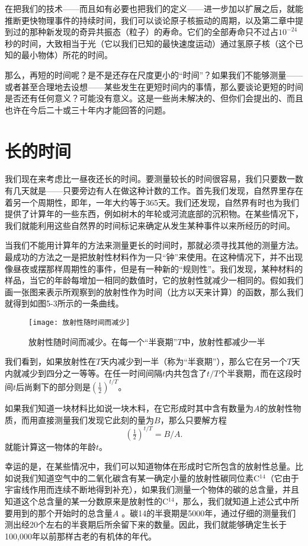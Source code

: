 \documentclass[11pt,oneside]{book}
\begin{document}
\begin{common-format}
在把我们的技术——而且如有必要也把我们的定义——进一步加以扩展之后，就能推断更快物理事件的持续时间，我们可以谈论原子核振动的周期，以及第二章中提到过的那种新发现的奇异共振态（粒子）的寿命。它们的全部寿命只不过占$ 10^{-24} $秒的时间，大致相当于光（它以我们已知的最快速度运动）通过氢原子核（这个已知的最小物体）所花的时间。

那么，再短的时间呢？是不是还存在尺度更小的“时间”？如果我们不能够测量——或者甚至合理地去设想——某些发生在更短时间内的事情，那么要谈论更短的时间是否还有任何意义？可能没有意义。这是一些尚未解决的、但你们会提出的、而且也许在今后二十或三十年内才能回答的问题。


\section{长的时间}
我们现在来考虑比一昼夜还长的时间。要测量较长的时间很容易，我们只要数一数有几天就是——只要旁边有人在做这种计数的工作。首先我们发现，自然界里存在着另一个周期性，即年，一年大约等于365天。我们还发现，自然界有时也为我们提供了计算年的一些东西，例如树木的年轮或河流底部的沉积物。在某些情况下，我们就能利用这些自然界的时间标记来确定从发生某种事件以来所经历的时间。

当我们不能用计算年的方法来测量更长的时间时，那就必须寻找其他的测量方法。最成功的方法之一是把放射性材料作为一只“钟”来使用。在这种情况下，并不出现像昼夜或摆那样周期性的事件，但是有一种新的“规则性”。我们发现，某种材料的样品，当它的年龄每增加一相同的数值时，它的放射性就减少一相同的。假如我们画一张图来表示所观察到的放射性作为时间（比方以天来计算）的函数，那么我们就得到如图5-3所示的一条曲线。
\begin{figure}[H]
\centering
\texttt{[image: 放射性随时间而减少]}
\caption{\footnotesize 放射性随时间而减少。在每一个“半衰期”$ T $中，放射性都减少一半}
\end{figure}
我们看到，如果放射性在$ T $天内减少到一半（称为“半衰期”），那么它在另一个$ T $天内就减少到四分之一等等。在任一时间间隔$ t $内共包含了$ t/T $个半衰期，而在这段时间$ t $后尚剩下的部分则是$ (\tfrac{1}{2})^{t/T} $。

如果我们知道一块材料比如说一块木料，在它形成时其中含有数量为$ A $的放射性物质，而用直接测量我们发现它此刻的量为$ B $，那么只要解方程
\begin{equation*}
(\tfrac{1}{2})^{t/T}=B/A.
\end{equation*}
就能计算这一物体的年龄$ t $。

幸运的是，在某些情况中，我们可以知道物体在形成时它所包含的放射性总量。比如说我们知道空气中的二氧化碳含有某一确定小量的放射性碳同位素C$ ^{14} $（它由于宇宙线作用而连续不断地得到补充），如果我们测量一个物体的碳的总含量，并且知道这个总含量的某一分数原来是放射性的C$ ^{14} $，那么，我们就知道上述公式中所要用到的那个开始时的总含量$ A $ 。碳14的半衰期是5000年，通过仔细的测量我们测出经20个左右的半衰期后所余留下来的数量。因此，我们就能够确定生长于100,000年以前那样古老的有机体的年代。


\end{common-format}
\end{document}
